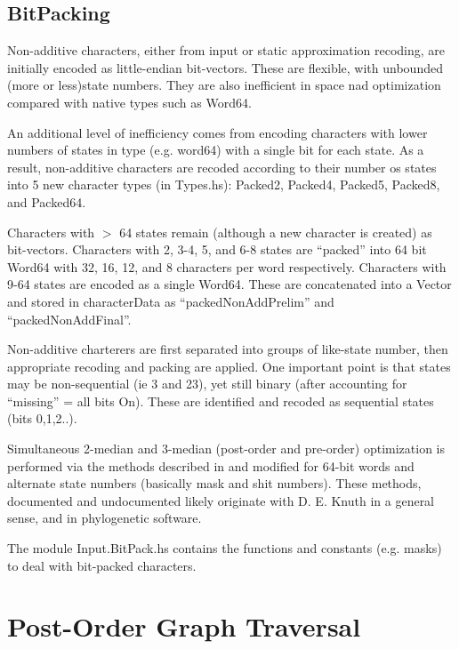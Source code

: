 \documentclass[11pt]{article}
\begin{document}
		\subsection{BitPacking}
		Non-additive characters, either from input or static approximation recoding, are initially 
		encoded as little-endian bit-vectors.  These are flexible, with unbounded (more or less)state numbers.
		They are also inefficient in space nad optimization compared with native types such as Word64. 
		
		An additional level of inefficiency comes from encoding characters with lower numbers of states in type (e.g. word64) with a single bit for each state.  As a result, non-additive characters are recoded according to their 
		number os states into 5 new character types (in Types.hs): Packed2, Packed4, Packed5, Packed8, and Packed64. 
		
		Characters with $>$ 64 states remain (although a new character is created) as bit-vectors.  Characters with 
		2, 3-4, 5, and 6-8 states are ``packed'' into 64 bit Word64 with 32, 16, 12, and 8 characters per word respectively. Characters with 9-64 states are encoded as a single Word64. These are concatenated into a Vector and stored in characterData as ``packedNonAddPrelim'' and ``packedNonAddFinal''.
		
		Non-additive charterers are first separated into groups of like-state number, then appropriate recoding
		and packing are applied.  One important point is that states may be non-sequential (ie 3 and 23), yet
		still binary (after accounting for ``missing'' = all bits On).  These are identified and recoded as sequential states (bits 0,1,2..).
		
		Simultaneous 2-median and 3-median (post-order and pre-order) optimization is performed via the methods described in \cite{WhiteandHolland2011} and \cite{goloboff2002} modified for 64-bit words and alternate state numbers (basically mask and shit numbers).  These methods, documented and undocumented likely originate with D. E. Knuth in a general sense, and \cite{Farris1988} in phylogenetic software.
		
		The module Input.BitPack.hs contains the functions and constants (e.g. masks) to deal 
		with bit-packed characters.
		
	\section{Post-Order Graph Traversal}
\end{document}
